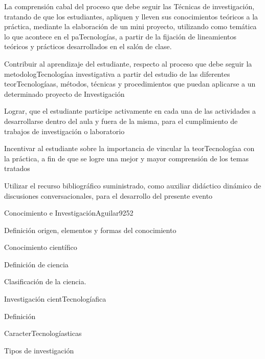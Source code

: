 \begin{syllabus}


\begin{justification}
La comprensión cabal del proceso que debe seguir las Técnicas de
investigación,  tratando de que los estudiantes, apliquen y lleven 
sus conocimientos teóricos a la  práctica, mediante la elaboración 
de un mini proyecto,  utilizando como temática  lo que acontece en 
el paTecnologías,  a partir de la fijación de lineamientos  teóricos y 
prácticos desarrollados en el salón de clase.
\end{justification}

\begin{goals}
\item Contribuir al aprendizaje del estudiante, respecto al proceso que debe seguir la metodologTecnologíaa investigativa a partir del estudio de las diferentes teorTecnologíaas, métodos, técnicas y procedimientos que puedan aplicarse a un determinado proyecto de Investigación 
\item Lograr, que el estudiante participe activamente  en cada una de las actividades a desarrollarse dentro del aula  y fuera de la misma, para el cumplimiento de trabajos de investigación o laboratorio
\item Incentivar al estudiante sobre la  importancia de vincular la teorTecnologíaa con la práctica, a fin de que se logre una mejor y mayor comprensión de los temas tratados
\item Utilizar el recurso bibliográfico suministrado, como auxiliar didáctico dinámico de discusiones conversacionales,  para el desarrollo del presente evento
\end{goals}

\begin{outcomes}
\end{outcomes}

\begin{unit}{Conocimiento e Investigación}{Aguilar92}{5}{2}
   \begin{topics}
      \item Definición origen, elementos y formas del conocimiento
	\item Conocimiento científico
	\item Definición de ciencia
	\item Clasificación de la ciencia.
	\item Investigación cientTecnologíafica
	\item Definición
	\item CaracterTecnologíasticas
	\item Tipos de investigación
   \end{topics}


\end{unit}
\end{syllabus}
